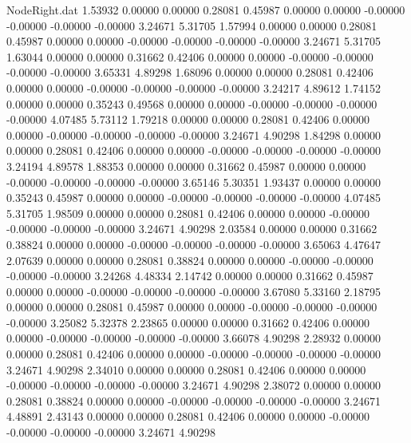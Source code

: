 \begin{filecontents}{NodeRight.dat}
   1.53932    0.00000    0.00000     0.28081    0.45987    0.00000    0.00000   -0.00000   -0.00000   -0.00000   -0.00000    3.24671    5.31705
   1.57994    0.00000    0.00000     0.28081    0.45987    0.00000    0.00000   -0.00000   -0.00000   -0.00000   -0.00000    3.24671    5.31705
   1.63044    0.00000    0.00000     0.31662    0.42406    0.00000    0.00000   -0.00000   -0.00000   -0.00000   -0.00000    3.65331    4.89298
   1.68096    0.00000    0.00000     0.28081    0.42406    0.00000    0.00000   -0.00000   -0.00000   -0.00000   -0.00000    3.24217    4.89612
   1.74152    0.00000    0.00000     0.35243    0.49568    0.00000    0.00000   -0.00000   -0.00000   -0.00000   -0.00000    4.07485    5.73112
   1.79218    0.00000    0.00000     0.28081    0.42406    0.00000    0.00000   -0.00000   -0.00000   -0.00000   -0.00000    3.24671    4.90298
   1.84298    0.00000    0.00000     0.28081    0.42406    0.00000    0.00000   -0.00000   -0.00000   -0.00000   -0.00000    3.24194    4.89578
   1.88353    0.00000    0.00000     0.31662    0.45987    0.00000    0.00000   -0.00000   -0.00000   -0.00000   -0.00000    3.65146    5.30351
   1.93437    0.00000    0.00000     0.35243    0.45987    0.00000    0.00000   -0.00000   -0.00000   -0.00000   -0.00000    4.07485    5.31705
   1.98509    0.00000    0.00000     0.28081    0.42406    0.00000    0.00000   -0.00000   -0.00000   -0.00000   -0.00000    3.24671    4.90298
   2.03584    0.00000    0.00000     0.31662    0.38824    0.00000    0.00000   -0.00000   -0.00000   -0.00000   -0.00000    3.65063    4.47647
   2.07639    0.00000    0.00000     0.28081    0.38824    0.00000    0.00000   -0.00000   -0.00000   -0.00000   -0.00000    3.24268    4.48334
   2.14742    0.00000    0.00000     0.31662    0.45987    0.00000    0.00000   -0.00000   -0.00000   -0.00000   -0.00000    3.67080    5.33160
   2.18795    0.00000    0.00000     0.28081    0.45987    0.00000    0.00000   -0.00000   -0.00000   -0.00000   -0.00000    3.25082    5.32378
   2.23865    0.00000    0.00000     0.31662    0.42406    0.00000    0.00000   -0.00000   -0.00000   -0.00000   -0.00000    3.66078    4.90298
   2.28932    0.00000    0.00000     0.28081    0.42406    0.00000    0.00000   -0.00000   -0.00000   -0.00000   -0.00000    3.24671    4.90298
   2.34010    0.00000    0.00000     0.28081    0.42406    0.00000    0.00000   -0.00000   -0.00000   -0.00000   -0.00000    3.24671    4.90298
   2.38072    0.00000    0.00000     0.28081    0.38824    0.00000    0.00000   -0.00000   -0.00000   -0.00000   -0.00000    3.24671    4.48891
   2.43143    0.00000    0.00000     0.28081    0.42406    0.00000    0.00000   -0.00000   -0.00000   -0.00000   -0.00000    3.24671    4.90298

\end{filecontents}
